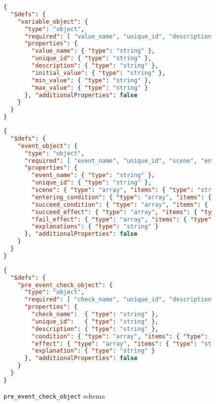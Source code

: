 \begin{figure}[!ht]
\centering
\small
\begin{minipage}{0.95\textwidth}
\begin{lstlisting}[language=json]
{
  "$defs": {
    "variable_object": {
      "type": "object",
      "required": [ "value_name", "unique_id", "description", "min_value", "max_value" ],
      "properties": {
        "value_name": { "type": "string" },
        "unique_id": { "type": "string" },
        "description": { "type": "string" },
        "initial_value": { "type": "string" },
        "min_value": { "type": "string" },
        "max_value": { "type": "string" }
      }, "additionalProperties": false
    }
  }
}
\end{lstlisting}
\caption{\texttt{variable\_object} schema}
\label{fig:variable-schema}
\end{minipage}

\begin{minipage}{0.95\textwidth}
\begin{lstlisting}[language=json]
{
  "$defs": {
    "event_object": {
      "type": "object",
      "required": [ "event_name", "unique_id", "scene", "entering_condition", "succeed_condition", "succeed_effect", "fail_effect" ],
      "properties": {
        "event_name": { "type": "string" },
        "unique_id": { "type": "string" },
        "scene": { "type": "array", "items": { "type": "string" } },
        "entering_condition": { "type": "array", "items": { "type": "string" } },
        "succeed_condition": { "type": "array", "items": { "type": "string" } },
        "succeed_effect": { "type": "array", "items": { "type": "string" } },
        "fail_effect": { "type": "array", "items": { "type": "string" } },
        "explanations": { "type": "string" }
      }, "additionalProperties": false
    }
  }
}
\end{lstlisting}
\caption{\texttt{event\_object} schema}
\label{fig:event-schema}
\end{minipage}

\begin{minipage}{0.95\textwidth}
\begin{lstlisting}[language=json]
{
  "$defs": {
    "pre_event_check_object": {
      "type": "object",
      "required": [ "check_name", "unique_id", "description", "condition", "effect" ],
      "properties": {
        "check_name":  { "type": "string" },
        "unique_id":   { "type": "string" },
        "description": { "type": "string" },
        "condition": { "type": "array", "items": { "type": "string" } },
        "effect": { "type": "array", "items": { "type": "string" } },
        "explanation": { "type": "string" }
      }, "additionalProperties": false
    }
  }
}
\end{lstlisting}
\caption{\texttt{pre\_event\_check\_object} schema}
\label{fig:pre-event-schema}
\end{minipage}
\end{figure}

